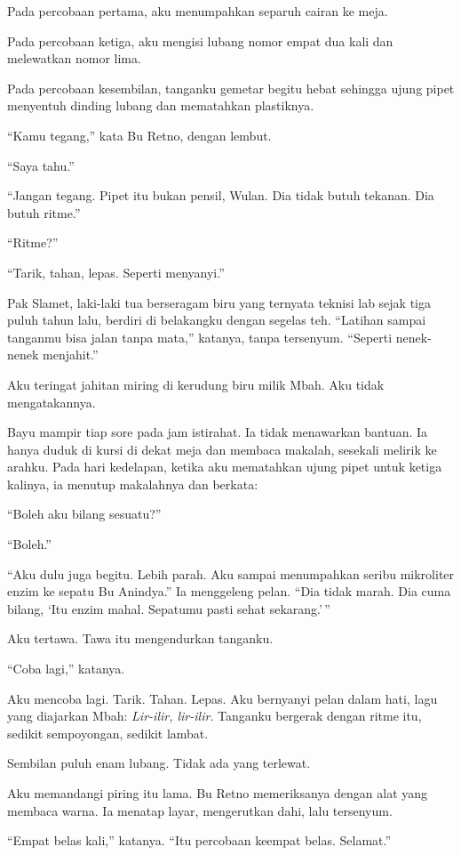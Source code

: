 \documentclass[11pt,twoside,openany]{book}
\begin{document}
Pada percobaan pertama, aku menumpahkan separuh cairan ke meja.

Pada percobaan ketiga, aku mengisi lubang nomor empat dua kali dan melewatkan nomor lima.

Pada percobaan kesembilan, tanganku gemetar begitu hebat sehingga ujung pipet menyentuh dinding lubang dan mematahkan plastiknya.

``Kamu tegang,'' kata Bu Retno, dengan lembut.

``Saya tahu.''

``Jangan tegang. Pipet itu bukan pensil, Wulan. Dia tidak butuh tekanan. Dia butuh ritme.''

``Ritme?''

``Tarik, tahan, lepas. Seperti menyanyi.''

Pak Slamet, laki-laki tua berseragam biru yang ternyata teknisi lab sejak tiga puluh tahun lalu, berdiri di belakangku dengan segelas teh. ``Latihan sampai tanganmu bisa jalan tanpa mata,'' katanya, tanpa tersenyum. ``Seperti nenek-nenek menjahit.''

Aku teringat jahitan miring di kerudung biru milik Mbah. Aku tidak mengatakannya.

Bayu mampir tiap sore pada jam istirahat. Ia tidak menawarkan bantuan. Ia hanya duduk di kursi di dekat meja dan membaca makalah, sesekali melirik ke arahku. Pada hari kedelapan, ketika aku mematahkan ujung pipet untuk ketiga kalinya, ia menutup makalahnya dan berkata:

``Boleh aku bilang sesuatu?''

``Boleh.''

``Aku dulu juga begitu. Lebih parah. Aku sampai menumpahkan seribu mikroliter enzim ke sepatu Bu Anindya.'' Ia menggeleng pelan. ``Dia tidak marah. Dia cuma bilang, `Itu enzim mahal. Sepatumu pasti sehat sekarang.'\,''

Aku tertawa. Tawa itu mengendurkan tanganku.

``Coba lagi,'' katanya.

Aku mencoba lagi. Tarik. Tahan. Lepas. Aku bernyanyi pelan dalam hati, lagu yang diajarkan Mbah: \emph{Lir-ilir, lir-ilir}. Tanganku bergerak dengan ritme itu, sedikit sempoyongan, sedikit lambat.

Sembilan puluh enam lubang. Tidak ada yang terlewat.

Aku memandangi piring itu lama. Bu Retno memeriksanya dengan alat yang membaca warna. Ia menatap layar, mengerutkan dahi, lalu tersenyum.

``Empat belas kali,'' katanya. ``Itu percobaan keempat belas. Selamat.''
\end{document}
